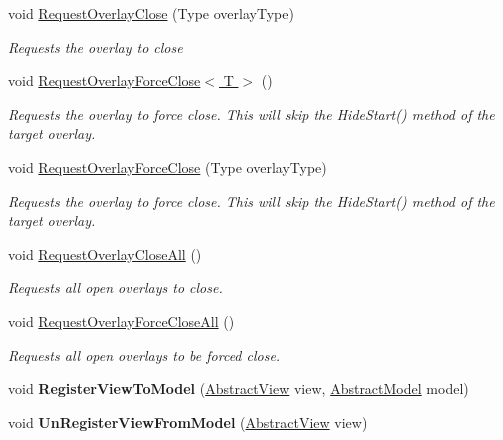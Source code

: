 \begin{DoxyCompactItemize}
void \hyperlink{class_scaffolding_1_1_view_manager_base_a9fd519e341f2075813bfb900a461130d}{Request\+Overlay\+Close} (Type overlay\+Type)
\begin{DoxyCompactList}\small\item\em Requests the overlay to close \end{DoxyCompactList}\item 
void \hyperlink{class_scaffolding_1_1_view_manager_base_a187a7e1d15142349f697174cf8f868b4}{Request\+Overlay\+Force\+Close$<$ T $>$} ()
\begin{DoxyCompactList}\small\item\em Requests the overlay to force close. This will skip the Hide\+Start() method of the target overlay. \end{DoxyCompactList}\item 
void \hyperlink{class_scaffolding_1_1_view_manager_base_a1f2666a080551b586f7f0847f3958e5d}{Request\+Overlay\+Force\+Close} (Type overlay\+Type)
\begin{DoxyCompactList}\small\item\em Requests the overlay to force close. This will skip the Hide\+Start() method of the target overlay. \end{DoxyCompactList}\item 
void \hyperlink{class_scaffolding_1_1_view_manager_base_a3adaf70659846c8ba4fe29c6d145ca3e}{Request\+Overlay\+Close\+All} ()
\begin{DoxyCompactList}\small\item\em Requests all open overlays to close. \end{DoxyCompactList}\item 
void \hyperlink{class_scaffolding_1_1_view_manager_base_a85021ea2e970c2e46badb5bdf17cbf49}{Request\+Overlay\+Force\+Close\+All} ()
\begin{DoxyCompactList}\small\item\em Requests all open overlays to be forced close. \end{DoxyCompactList}\item 
\hypertarget{class_scaffolding_1_1_view_manager_base_aa255a6fa1922a757dbc52f66e3cd75f6}{void {\bfseries Register\+View\+To\+Model} (\hyperlink{class_scaffolding_1_1_abstract_view}{Abstract\+View} view, \hyperlink{class_scaffolding_1_1_abstract_model}{Abstract\+Model} model)}\label{class_scaffolding_1_1_view_manager_base_aa255a6fa1922a757dbc52f66e3cd75f6}

\item 
\hypertarget{class_scaffolding_1_1_view_manager_base_a9b5acbdc66d3036270f2cc22c5c6bfb4}{void {\bfseries Un\+Register\+View\+From\+Model} (\hyperlink{class_scaffolding_1_1_abstract_view}{Abstract\+View} view)}\label{class_scaffolding_1_1_view_manager_base_a9b5acbdc66d3036270f2cc22c5c6bfb4}

\end{DoxyCompactItemize}
